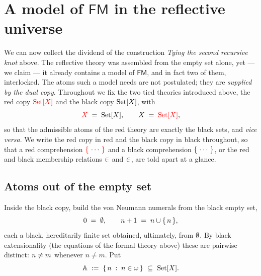 
\section{A model of $\mathsf{FM}$ in the reflective universe}
\label{sec:fmmodel}

We can now collect the dividend of the construction \emph{Tying the second
recursive knot} above. The reflective theory was assembled from the empty set
alone, yet --- we claim --- it already contains a model of $\mathsf{FM}$, and in
fact two of them, interlocked. The atoms such a model needs are not postulated;
they are \emph{supplied by the dual copy}. Throughout we fix the two tied
theories introduced above, the red copy $\textcolor{red}{\mathrm{Set}[X]}$ and the black copy $\textcolor{black}{\mathrm{Set}[X]}$,
with
\[
  \textcolor{red}{X} \;=\; \textcolor{black}{\mathrm{Set}[X]}, \qquad \textcolor{black}{X} \;=\; \textcolor{red}{\mathrm{Set}[X]},
\]
so that the admissible atoms of the red theory are exactly the black sets, and
\emph{vice versa}. We write the red copy in {\rd red} and the black copy in
{\bk black} throughout, so that a red comprehension $\textcolor{red}{\{}\,\cdots\,\textcolor{red}{\}}$ and a black
comprehension $\textcolor{black}{\{}\,\cdots\,\textcolor{black}{\}}$, or the red and black membership relations
$\mathrel{\textcolor{red}{\in}}$ and $\mathrel{\textcolor{black}{\in}}$, are told apart at a glance.

\subsection{Atoms out of the empty set}
\label{sec:fmmodel:atoms}

Inside the black copy, build the von Neumann numerals from the black empty set,
\[
  \textcolor{black}{0} \;=\; \textcolor{black}{\emptyset},
  \qquad
  \textcolor{black}{n+1} \;=\; \textcolor{black}{n} \mathbin{\textcolor{black}{\cup}} \textcolor{black}{\{}\,\textcolor{black}{n}\,\textcolor{black}{\}},
\]
each a black, hereditarily finite set obtained, ultimately, from $\textcolor{black}{\emptyset}$. By
black extensionality (the equations of the formal theory above) these are
pairwise distinct: $\textcolor{black}{n} \neq \textcolor{black}{m}$ whenever $n\neq m$. Put
\[
  \mathbb{A} \;:=\; \{\, \textcolor{black}{n} \;:\; n\in\omega \,\}\ \subseteq\ \textcolor{black}{\mathrm{Set}[X]} .
\]

